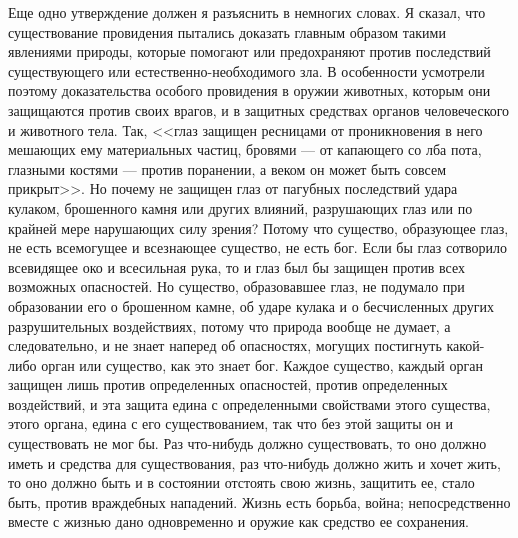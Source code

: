 \documentclass[12pt]{article}
\begin{document}
Еще одно утверждение должен я разъяснить в немногих словах. Я сказал, что существование провидения пытались доказать главным образом такими явлениями природы, которые помогают или предохраняют против последствий существующего или естественно-необходимого зла. В особенности усмотрели поэтому доказательства особого провидения в оружии животных, которым они защищаются против своих врагов, и в защитных средствах органов человеческого и животного тела. Так, <<глаз защищен ресницами от проникновения в него мешающих ему материальных частиц, бровями --- от капающего со лба пота, глазными костями --- против поранении, а веком он может быть совсем прикрыт>>. Но почему не защищен глаз от пагубных последствий удара кулаком, брошенного камня или других влияний, разрушающих глаз или по крайней мере нарушающих силу зрения? Потому что существо, образующее глаз, не есть всемогущее и всезнающее существо, не есть бог. Если бы глаз сотворило всевидящее око и всесильная рука, то и глаз был бы защищен против всех возможных опасностей. Но существо, образовавшее глаз, не подумало при образовании его о брошенном камне, об ударе кулака и о бесчисленных других разрушительных воздействиях, потому что природа вообще не думает, а следовательно, и не знает наперед об опасностях, могущих постигнуть какой-либо орган или существо, как это знает бог. Каждое существо, каждый орган защищен лишь против определенных опасностей, против определенных воздействий, и эта защита едина с определенными свойствами этого существа, этого органа, едина с его существованием, так что без этой защиты он и существовать не мог бы. Раз что-нибудь должно существовать, то оно должно иметь и средства для существования, раз что-нибудь должно жить и хочет жить, то оно должно быть и в состоянии отстоять свою жизнь, защитить ее, стало быть, против враждебных нападений. Жизнь есть борьба, война; непосредственно вместе с жизнью дано одновременно и оружие как средство ее сохранения. 
\end{document}
